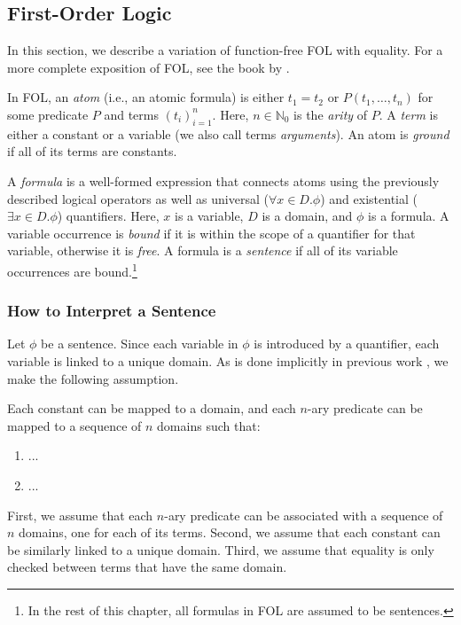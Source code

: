 \subsection{First-Order Logic}

In this section, we describe a variation of function-free FOL with
equality. For a more complete exposition of FOL, see the book by
\citet{DBLP:books/daglib/0023546}.

In FOL, an \emph{atom} (i.e., an atomic formula) is either
$t_1 = t_2$ or $P(t_1, \dots, t_n)$ for some predicate $P$ and terms
$(t_i)_{i=1}^n$. Here, $n \in \mathbb{N}_0$ is the \emph{arity} of $P$. A
\emph{term} is either a constant or a variable (we also call terms
\emph{arguments}). An atom is \emph{ground} if all of its terms are constants.

A \emph{formula} is a well-formed expression that connects atoms using the
previously described logical operators as well as universal
($\forall x \in D. \phi$) and existential ($\exists x \in D. \phi$) quantifiers.
Here, $x$ is a variable, $D$ is a domain, and $\phi$ is a formula. A variable
occurrence is \emph{bound} if it is within the scope of a quantifier for that
variable, otherwise it is \emph{free}. A formula is a \emph{sentence} if all of
its variable occurrences are bound.\footnote{In the rest of this chapter, all
  formulas in FOL are assumed to be sentences.}

\subsubsection{How to Interpret a Sentence}

Let $\phi$ be a sentence. Since each variable in $\phi$ is introduced by a
quantifier, each variable is linked to a unique domain. As is done implicitly in
previous work \citep{DBLP:phd/basesearch/VandenBroeck13}, we make the following
assumption.

\begin{assumption}
  Each constant can be mapped to a domain, and each $n$-ary predicate can be
  mapped to a sequence of $n$ domains such that:
  \begin{enumerate}
    \item ...
    \item ...
  \end{enumerate}
\end{assumption}

First, we assume that each $n$-ary predicate can be associated with a sequence
of $n$ domains, one for each of its terms. Second, we assume that each constant
can be similarly linked to a unique domain. Third, we assume that equality is
only checked between terms that have the same domain.

